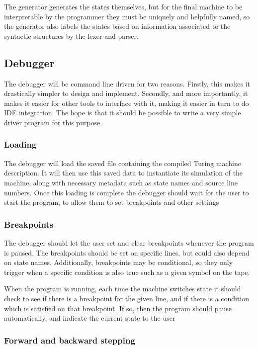 \documentclass[11pt]{article}
\begin{document}
The generator generates the states themselves, but for the final machine to be interpretable by the programmer they must be uniquely and helpfully named, so the generator also labels the states based on information associated to the syntactic structures by the lexer and parser.

\subsection{Debugger}

The debugger will be command line driven for two reasons. Firstly, this makes it drastically simpler to design and implement. Secondly, and more importantly, it makes it easier for other tools to interface with it, making it easier in turn to do IDE integration. The hope is that it should be possible to write a very simple driver program for this purpose.

\subsubsection{Loading}

The debugger will load the saved file containing the compiled Turing machine description. It will then use this saved data to instantiate its simulation of the machine, along with necessary metadata such as state names and source line numbers. Once this loading is complete the debugger should wait for the user to start the program, to allow them to set breakpoints and other settings

\subsubsection{Breakpoints}

The debugger should let the user set and clear breakpoints whenever the program is paused. The breakpoints should be set on specific lines, but could also depend on state names. Additionally, breakpoints may be conditional, so they only trigger when a specific condition is also true such as a given symbol on the tape.

When the program is running, each time the machine switches state it should check to see if there is a breakpoint for the given line, and if there is a condition which is satisfied on that breakpoint. If so, then the program should pause automatically, and indicate the current state to the user

\subsubsection{Forward and backward stepping}
\end{document}
